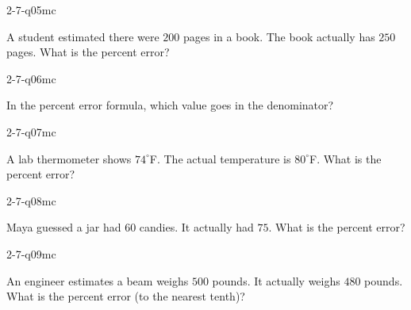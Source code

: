 \begin{practiceQuestion}{2-7-q05}{mc}
\begin{questionText}
A student estimated there were $200$ pages in a book. The book actually has $250$ pages. What is the percent error?
\end{questionText}
\end{practiceQuestion}

\begin{practiceQuestion}{2-7-q06}{mc}
\begin{questionText}
In the percent error formula, which value goes in the denominator?
\end{questionText}
\end{practiceQuestion}

\begin{practiceQuestion}{2-7-q07}{mc}
\begin{questionText}
A lab thermometer shows $74^\circ$F. The actual temperature is $80^\circ$F. What is the percent error?
\end{questionText}
\end{practiceQuestion}

\begin{practiceQuestion}{2-7-q08}{mc}
\begin{questionText}
Maya guessed a jar had $60$ candies. It actually had $75$. What is the percent error?
\end{questionText}
\end{practiceQuestion}

\begin{practiceQuestion}{2-7-q09}{mc}
\begin{questionText}
An engineer estimates a beam weighs $500$ pounds. It actually weighs $480$ pounds. What is the percent error (to the nearest tenth)?
\end{questionText}
\end{practiceQuestion}

